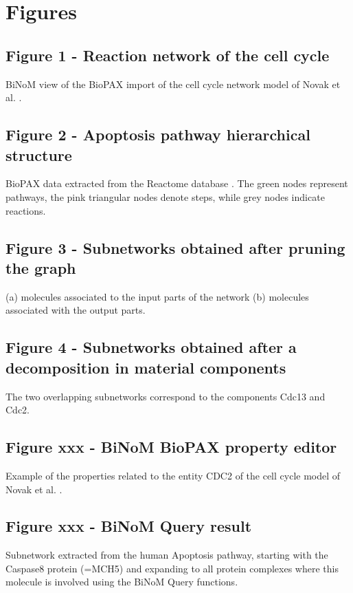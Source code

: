 \documentclass[10pt]{bmc_article}
\newenvironment{bmcformat}{\baselineskip20pt\sloppy\setboolean{publ}{false}}{\baselineskip20pt\sloppy}
\begin{document}
\begin{bmcformat}

\section*{Figures}
  \subsection*{Figure 1 - Reaction network of the cell cycle}
      BiNoM view of the BioPAX import of the cell cycle network model of Novak et al. \cite{novak1998model}.

  \subsection*{Figure 2 - Apoptosis pathway hierarchical structure}
      BioPAX data extracted from the Reactome database \cite{joshi2005reactome}. The green nodes represent pathways, the pink triangular nodes denote steps, while grey nodes indicate reactions.

\subsection*{Figure 3 - Subnetworks obtained after pruning the graph}
      (a) molecules associated to the input parts of the network (b) molecules associated with the output parts.

\subsection*{Figure 4 - Subnetworks obtained after a decomposition in material components}
      The two overlapping subnetworks correspond to the components Cdc13 and Cdc2. 


  \subsection*{Figure xxx - BiNoM BioPAX property editor}
      Example of the properties related to the entity CDC2 of the cell cycle model of Novak et al. \cite{novak1998model}.

  \subsection*{Figure xxx - BiNoM Query result}
      Subnetwork extracted from the human Apoptosis pathway, starting with the Caspase8 protein (=MCH5) and expanding to all protein complexes where this molecule is involved using the BiNoM Query functions.




\end{bmcformat}
\end{document}
